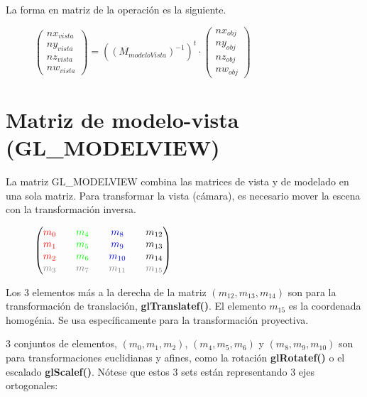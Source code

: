 La forma en matriz de la operación es la siguiente.

\begin{figure}[ht!]
  \centering
  \(
  \begin{pmatrix}
    nx_{vista}\\ny_{vista}\\nz_{vista}\\nw_{vista}
  \end{pmatrix}
  = ((M_{modeloVista})^{-1})^t \cdot
  \begin{pmatrix}
    nx_{obj}\\ny_{obj}\\nz_{obj}\\nw_{obj}
  \end{pmatrix}
  \)
\end{figure}

\section{Matriz de modelo-vista (GL\_MODELVIEW)}
La matriz GL\_MODELVIEW combina las matrices de vista y de modelado en una sola matriz. Para transformar la vista (cámara), es necesario mover la escena con la transformación inversa.

\begin{figure}[ht]
  \centering
  \(
  \begin{pmatrix}
    \textcolor{red}{m_0} && \textcolor{green}{m_4} && \textcolor{blue}{m_8} && m_{12}\\
    \textcolor{red}{m_1} && \textcolor{green}{m_5} && \textcolor{blue}{m_9} && m_{13}\\
    \textcolor{red}{m_2} && \textcolor{green}{m_6} && \textcolor{blue}{m_{10}} && m_{14}\\
    \textcolor{gray}{m_3} && \textcolor{gray}{m_7} && \textcolor{gray}{m_{11}} && \textcolor{gray}{m_{15}}
  \end{pmatrix}
  \)
\end{figure}

Los 3 elementos más a la derecha de la matriz \((m_{12}, m_{13}, m_{14})\) son para la transformación de translación, \textbf{glTranslatef()}. El elemento \(m_{15}\) es la coordenada homogénia. Se usa específicamente para la transformación proyectiva.

3 conjuntos de elementos, \((m_0, m_1, m_2)\), \((m_4, m_5, m_6)\) y \((m_8, m_9, m_{10})\) son para transformaciones euclidianas y afines, como la rotación \textbf{glRotatef()} o el escalado \textbf{glScalef()}. Nótese que estos 3 sets están representando 3 ejes ortogonales:


